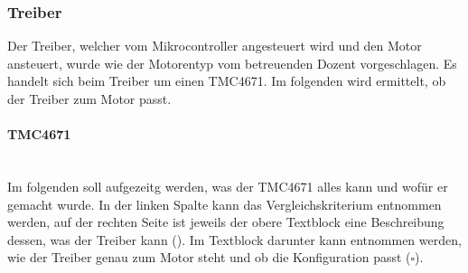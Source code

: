 \subsubsection{Treiber}\label{subsec:Treiber}

Der Treiber, welcher vom Mikrocontroller angesteuert wird und den Motor ansteuert, wurde wie der Motorentyp vom betreuenden Dozent vorgeschlagen. Es handelt sich beim Treiber um einen TMC4671. Im folgenden wird ermittelt, ob der Treiber zum Motor passt.

\paragraph{TMC4671}\label{par:Anforderungen_TMC4671}\mbox{}\\

Im folgenden soll aufgezeitg werden, was der TMC4671 alles kann und wofür er gemacht wurde. In der linken Spalte kann das Vergleichskriterium entnommen werden, auf der rechten Seite ist jeweils der obere Textblock eine Beschreibung dessen, was der Treiber kann (\textbullet). Im Textblock darunter kann entnommen werden, wie der Treiber genau zum Motor steht und ob die Konfiguration passt ($\square$).

